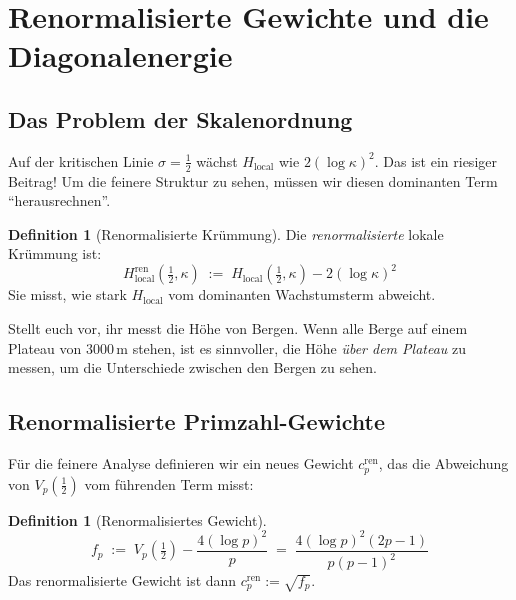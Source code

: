 \documentclass[11pt,a4paper]{article}
\theoremstyle{plain}
\theoremstyle{definition}
\newtheorem{definition}[theorem]{Definition}
\theoremstyle{remark}
\newcommand{\Hlocal}{H_{\mathrm{local}}}
\newcommand{\cren}{c_p^{\mathrm{ren}}}
\newcommand{\Hren}{H_{\mathrm{local}}^{\mathrm{ren}}}
\begin{document}
	
	
	\section{Renormalisierte Gewichte und die Diagonalenergie}\label{sec:renorm}
	
	\subsection{Das Problem der Skalenordnung}
	
	Auf der kritischen Linie $\sigma = \frac{1}{2}$ w\"achst $\Hlocal$ wie
	$2(\log\kappa)^2$. Das ist ein riesiger Beitrag! Um die feinere Struktur
	zu sehen, m\"ussen wir diesen dominanten Term ``herausrechnen''.
	
	\begin{definition}[Renormalisierte Kr\"ummung]
		Die \emph{renormalisierte} lokale Kr\"ummung ist:
		\begin{equation}
			\Hren(\tfrac{1}{2}, \kappa)
			\;:=\; \Hlocal(\tfrac{1}{2}, \kappa) - 2(\log\kappa)^2
		\end{equation}
		Sie misst, wie stark $\Hlocal$ vom dominanten Wachstumsterm abweicht.
	\end{definition}
	
	Stellt euch vor, ihr messt die H\"ohe von Bergen. Wenn alle Berge auf
	einem Plateau von 3000\,m stehen, ist es sinnvoller, die H\"ohe
	\emph{\"uber dem Plateau} zu messen, um die Unterschiede zwischen den
	Bergen zu sehen.
	
	\subsection{Renormalisierte Primzahl-Gewichte}
	
	F\"ur die feinere Analyse definieren wir ein neues Gewicht $\cren$,
	das die Abweichung von $V_p(\frac{1}{2})$ vom f\"uhrenden Term misst:
	
	\begin{definition}[Renormalisiertes Gewicht]
		\begin{equation}
			f_p \;:=\; V_p(\tfrac{1}{2}) - \frac{4(\log p)^2}{p}
			\;=\; \frac{4(\log p)^2(2p-1)}{p(p-1)^2}
		\end{equation}
		Das renormalisierte Gewicht ist dann $\cren := \sqrt{f_p}$.
	\end{definition}
	
\end{document}

